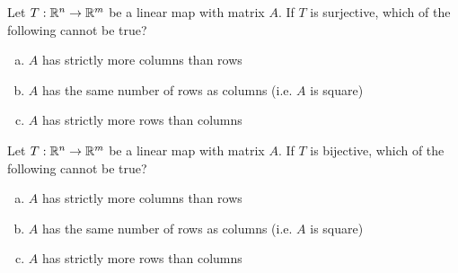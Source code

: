 \begin{applicationActivities}
\begin{activity}{5}
Let $T: \mathbb{R}^n \rightarrow \mathbb{R}^m$ be a linear map with matrix $A$.
If $T$ is surjective, which of the following cannot be true?
\begin{enumerate}[(a)]
\item $A$ has strictly more columns than rows
\item $A$ has the same number of rows as columns (i.e. $A$ is square)
\item $A$ has strictly more rows than columns
\end{enumerate}
\end{activity}

\begin{activity}{5}
Let $T: \mathbb{R}^n \rightarrow \mathbb{R}^m$ be a linear map with matrix $A$.
If $T$ is bijective, which of the following cannot be true?
\begin{enumerate}[(a)]
\item $A$ has strictly more columns than rows
\item $A$ has the same number of rows as columns (i.e. $A$ is square)
\item $A$ has strictly more rows than columns
\end{enumerate}
\end{activity}

\end{applicationActivities}
